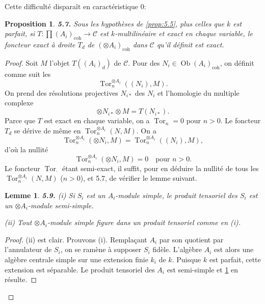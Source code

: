 \documentclass[12pt,a4paper]{article}
\theoremstyle{plain}
\newtheorem{lemma}[theorem]{Lemme}
\newtheorem{proposition}[theorem]{Proposition}
\theoremstyle{definition}
\theoremstyle{remark}
\DeclareMathOperator{\Tor}{Tor}
\DeclareMathOperator{\Ob}{Ob}
\begin{document}
Cette difficulté disparaît en caractéristique 0:

\begin{proposition}\label{prop:5.7}
\textbf{5.7.} Sous les hypothèses de \ref{prop:5.5}, plus celles que $k$ est parfait, si $T : \prod (A_i)_\mathrm{coh} \to \mathcal{C}$ est $k$-multilinéaire et exact en chaque variable, le foncteur exact à droite $T_d$ de $(\otimes A_i)_\mathrm{coh}$ dans $\mathcal{C}$ qu'il définit est exact.
\end{proposition}

\begin{proof}
Soit $M$ l'objet $T((A_i)_d)$ de $\mathcal{C}$. Pour des $N_i \in \Ob(A_i)_\mathrm{coh}$, on définit comme suit les
\[
\Tor_n^{\otimes A_i}((N_i), M).
\]
On prend des résolutions projectives $N_{i*}$ des $N_i$ et l'homologie du multiple complexe
\[
\otimes N_{i*} \otimes M = T(N_{i*}).
\]
Parce que $T$ est exact en chaque variable, on a $\Tor_n = 0$ pour $n > 0$. Le foncteur $T_d$ se dérive de même en $\Tor_n^{\otimes A_i}(N, M)$. On a
\[
\Tor_n^{\otimes A_i}(\otimes N_i, M) = \Tor_n^{\otimes A_i}((N_i), M),
\]
d'où la nullité
\begin{equation}\label{eq:5.7.1}
\Tor_n^{\otimes A_i}(\otimes N_i, M) = 0 \quad \text{pour } n > 0.
\end{equation}
Le foncteur $\Tor_\cdot$ étant semi-exact, il suffit, pour en déduire la nullité de tous les $\Tor_n^{\otimes A_i}(N, M)$ ($n > 0$), et 5.7, de vérifier le lemme suivant.

\begin{lemma}\label{lem:5.9}
\textbf{5.9.} (i) Si $S_i$ est un $A_i$-module simple, le produit tensoriel des $S_i$ est un $\otimes A_i$-module semi-simple.

(ii) Tout $\otimes A_i$-module simple figure dans un produit tensoriel comme en (i).
\end{lemma}

\begin{proof}
(ii) est clair. Prouvons (i). Remplaçant $A_i$ par son quotient par l'annulateur de $S_i$, on se ramène à supposer $S_i$ fidèle. L'algèbre $A_i$ est alors une algèbre centrale simple sur une extension finie $k_i$ de $k$. Puisque $k$ est parfait, cette extension est séparable. Le produit tensoriel des $A_i$ est semi-simple et \ref{lem:5.9} en résulte.
\end{proof}
\end{proof}

\subsection{}
\end{document}
